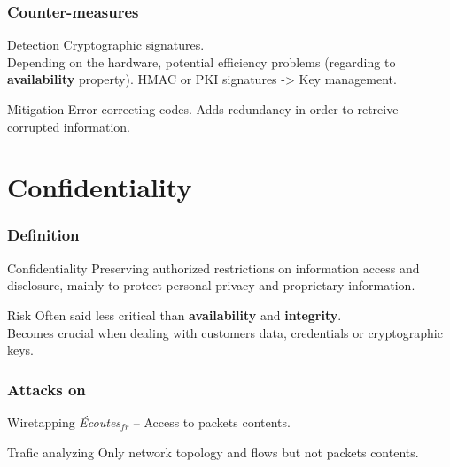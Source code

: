 \documentclass{beamer}
\begin{document}
\begin{frame}
    \frametitle{Counter-measures}

    \begin{block}{Detection}
        Cryptographic signatures.\\
        \medskip
        Depending on the hardware, potential efficiency problems (regarding to {\bf availability} property).
        HMAC or PKI signatures -> Key management.
    \end{block}
    \vfill
    \begin{block}{Mitigation}
        Error-correcting codes. Adds redundancy in order to retreive corrupted information.
    \end{block}
\end{frame}

\section{Confidentiality}

\begin{frame}
    \tableofcontents[currentsection]
\end{frame}

\begin{frame}
    \frametitle{Definition}

    \begin{block}{Confidentiality}
         Preserving authorized restrictions on information access and disclosure, mainly to protect personal privacy and proprietary information.
    \end{block}
    \vfill
    \begin{block}{Risk}
        Often said less critical than {\bf availability} and {\bf integrity}.\\
        \medskip
        Becomes crucial when dealing with customers data, credentials or cryptographic keys.
    \end{block}
\end{frame}

\begin{frame}
    \frametitle{Attacks on }

    \begin{block}{Wiretapping}
        {\em \'Ecoutes}$_{fr}$ -- Access to packets contents.
    \end{block}
    \vfill
    \begin{block}{Trafic analyzing}
        Only network topology and flows but not packets contents.
    \end{block}
\end{frame}
\end{document}
